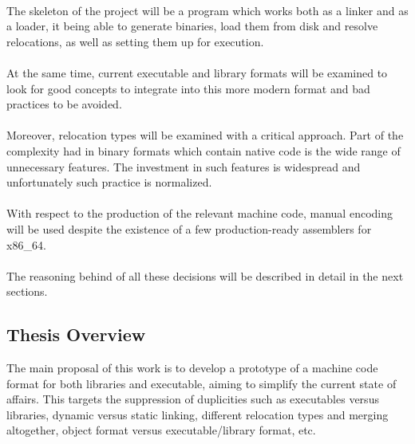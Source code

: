 \documentclass[12pt]{article}
\begin{document}
    \paragraph{}The skeleton of the project will be a program which works both as a linker and as a loader, it being able to generate binaries, load them from disk and resolve relocations, as well as setting them up for execution.
    
    \paragraph{}At the same time, current executable and library formats will be examined to look for good concepts to integrate into this more modern format and bad practices to be avoided.
    
    \paragraph{}Moreover, relocation types will be examined with a critical approach. Part of the complexity had in binary formats which contain native code is the wide range of unnecessary features. The investment in such features is widespread and unfortunately such practice is normalized.
    
    \paragraph{} With respect to the production of the relevant machine code, manual encoding will be used despite the existence of a few production-ready assemblers for x86\_64. 
    
    \paragraph{} The reasoning behind of all these decisions will be described in detail in the next sections.

%	

	\subsection{Thesis Overview}
	The main proposal of this work is to develop a prototype of a machine code format for both libraries and executable, aiming to simplify the current state of affairs. This targets the suppression of duplicities such as executables versus libraries, dynamic versus static linking, different relocation types and merging altogether, object format versus executable/library format, etc.
	
\end{document}
